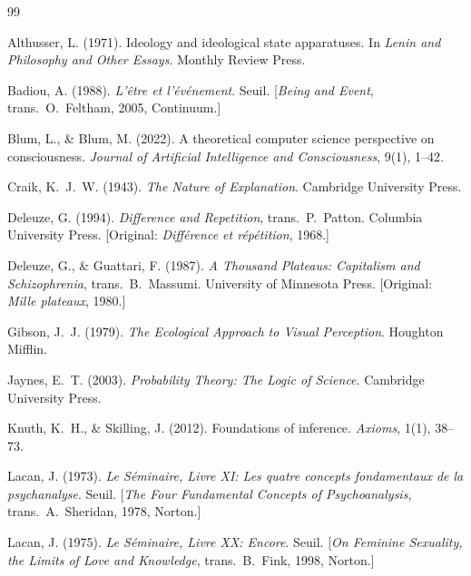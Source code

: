 \documentclass[10pt,a4paper]{article}
\begin{document}
\begin{thebibliography}{99}

Althusser, L. (1971).
Ideology and ideological state apparatuses.
In \textit{Lenin and Philosophy and Other Essays}.
Monthly Review Press.

Badiou, A. (1988).
\textit{L'être et l'événement}.
Seuil. [\textit{Being and Event}, trans.\ O.\ Feltham, 2005, Continuum.]

Blum, L., \& Blum, M. (2022).
A theoretical computer science perspective on consciousness.
\textit{Journal of Artificial Intelligence and Consciousness}, 9(1), 1--42.

Craik, K.~J.~W. (1943).
\textit{The Nature of Explanation}.
Cambridge University Press.

Deleuze, G. (1994).
\textit{Difference and Repetition}, trans.\ P.\ Patton.
Columbia University Press. [Original: \textit{Différence et répétition}, 1968.]

Deleuze, G., \& Guattari, F. (1987).
\textit{A Thousand Plateaus: Capitalism and Schizophrenia}, trans.\ B.\ Massumi.
University of Minnesota Press.
[Original: \textit{Mille plateaux}, 1980.]

Gibson, J.~J. (1979).
\textit{The Ecological Approach to Visual Perception}.
Houghton Mifflin.

Jaynes, E.~T. (2003).
\textit{Probability Theory: The Logic of Science}.
Cambridge University Press.

Knuth, K.~H., \& Skilling, J. (2012).
Foundations of inference.
\textit{Axioms}, 1(1), 38--73.

Lacan, J. (1973).
\textit{Le Séminaire, Livre XI: Les quatre concepts fondamentaux de la
psychanalyse}.
Seuil. [\textit{The Four Fundamental Concepts of Psychoanalysis},
trans.\ A.\ Sheridan, 1978, Norton.]

Lacan, J. (1975).
\textit{Le Séminaire, Livre XX: Encore}.
Seuil. [\textit{On Feminine Sexuality, the Limits of Love and Knowledge},
trans.\ B.\ Fink, 1998, Norton.]


\end{thebibliography}
\end{document}
